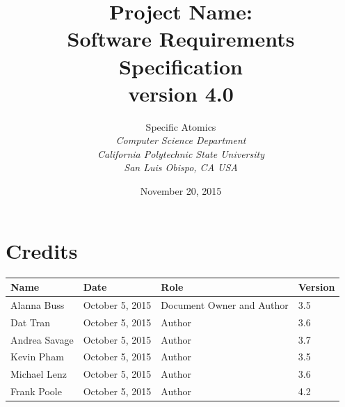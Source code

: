 \documentclass[12pt,oneside,letterpaper]{article}
\begin{document}
\title{\bfseries Project Name: \\
Software Requirements Specification\\
version 4.0}

\author {
\large{Specific Atomics}\\
\emph{Computer Science Department}\\
\emph{California Polytechnic State University}\\
\emph{San Luis Obispo, CA USA}\\
}

\date{November 20, 2015}
\maketitle \thispagestyle{empty}


\pagebreak
\tableofcontents
\pagebreak



\section*{Credits}
\begin{tabular}{|l|l|p{2.5in}|l|}
\hline
\textbf{Name} & \textbf{Date} & \textbf{Role} & \textbf{Version} \\
\hline
Alanna Buss & October 5, 2015 & Document Owner and Author & 3.5 \\
\hline
Dat Tran & October 5, 2015 & Author & 3.6 \\
\hline
Andrea Savage & October 5, 2015 & Author & 3.7 \\
\hline
Kevin Pham & October 5, 2015 & Author & 3.5 \\
\hline
Michael Lenz & October 5, 2015 & Author & 3.6 \\
\hline
Frank Poole & October 5, 2015 & Author & 4.2 \\
\hline
\end{tabular}

\end{document}
